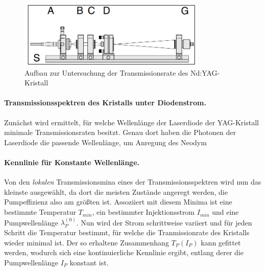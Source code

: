 \documentclass[../main.tex]{subfiles}
\begin{document}
        \begin{figure}[H]
            \centering
            \includegraphics[width=0.8\textwidth]{Bilddateien/Versuchsaufbau/Teil1.jpg}
            \caption{Aufbau zur Untersuchung der Transmissionsrate des Nd:YAG-Kristall}
            \label{fig:Aufbau:Teil1}
        \end{figure}    

        \paragraph{Transmissionsspektren des Kristalls unter Diodenstrom.}\label{sec:Transmissionspektren}
        Zunächst wird ermittelt, für welche Wellenlänge der Laserdiode der YAG-Kristall minimale Transmissionsraten besitzt. Genau dort haben die Photonen der Laserdiode die passende Wellenlänge, um Anregung des Neodym\\
        

        \paragraph{Kennlinie für Konstante Wellenlänge.} Von den \textit{lokalen} Transmissionsmina eines der Transmissionsspektren wird nun das kleinste ausgewählt, da dort die meisten Zustände angeregt werden, die Pumpeffizienz also am größten ist. Assoziiert mit diesem Minima ist eine bestimmte Temperatur $T_{min}$, ein bestimmter Injektionsstrom $I_{min}$ und eine Pumpwellenlänge $\lambda_P^{(0)}$. Nun wird der Strom schrittweise variiert und für jeden Schritt die Temperatur bestimmt, für welche die Tranmissionrate des Kristalls wieder minimal ist. Der so erhaltene Zusammenhang $T_P(I_P)$ kann gefittet werden, wodurch sich eine kontinuierliche Kennlinie ergibt, entlang derer die Pumpwellenlänge $I_P$ konstant ist.\\
        
\end{document}
